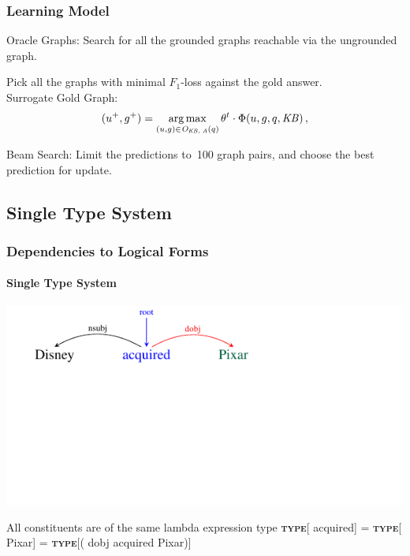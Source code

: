 \documentclass[mathserif,12pt]{beamer}
\newcommand{\argmax}{\operatornamewithlimits{arg\,max}}
\newcommand{\hlight}[1]{{\color{blue!80} #1}}
\newcommand\type[1]{\textbf{\textsc{type}}[#1]\xspace}
\begin{document}
\begin{frame}[noframenumbering]
\frametitle{Learning Model}

\hlight{Oracle Graphs: } Search for all the grounded graphs reachable via the ungrounded graph. 

\vspace{0.5cm}
Pick all the graphs with minimal $F_1$-loss against the gold answer. \\

\vspace{0.5cm}
\hlight{Surrogate Gold Graph: }
$$(u^{+},{g^{+}}) = \argmax_{(u,g) \in \mathit{O}_{\mathit{KB},\;\mathit{A}}(q)} \theta^{t} \cdot \Phi({u,g,q,\mathit{KB}})\,,$$

\vspace{0.5cm}
\hlight{Beam Search: } Limit the predictions to~100 graph pairs, and choose the best prediction for update.
\end{frame}

\subsection{Single Type System}

\begin{frame}[noframenumbering]
\frametitle{Dependencies to Logical Forms}
\framesubtitle{Single Type System}
\vspace{-3em}
\begin{center}
\includegraphics[trim=2em 9.4em 10em 0em,clip=true,scale=1.3]{figures/pixar_dobj}


\end{center}

\vspace{1cm}

\begin{block}{\centering All constituents are of the same lambda expression type}
\centering
\vspace{0.1cm}
\type{{\color{blue} acquired}} =  \type{{\color{blue!40!green!60!black} Pixar}}  = \type{{({\color{red} dobj} {\color{blue} acquired} {\color{blue!40!green!60!black} Pixar})}}
\vspace{0.1cm}
\end{block}
\end{frame}
\end{document}
